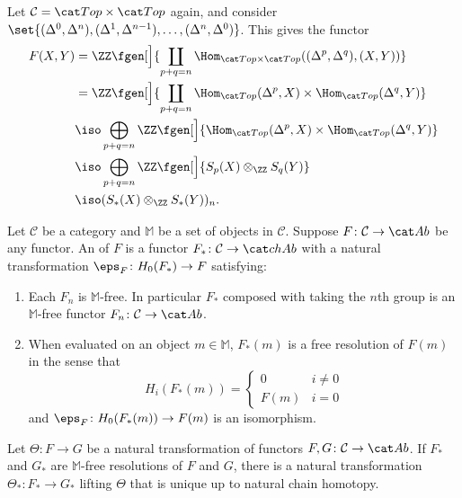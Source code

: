 \documentclass{standalone}
\begin{document}
\begin{example}
  Let \(\mathcal C = \cTop \times \cTop\) again, and consider
  \(
    \set{
      (\Delta^0, \Delta^n),
      (\Delta^1, \Delta^{n-1}), \dots,
      (\Delta^n, \Delta^0)
    }
  \).
  This gives the functor
  \begin{align*}
    F(X, Y) &= \ZZ\fgen[\Big]{\coprod_{p + q = n}
      \Hom_{\cTop \times \cTop}((\Delta^p, \Delta^q), (X, Y))} \\
    &= \ZZ\fgen[\Big]{\coprod_{p + q = n}
      \Hom_{\cTop}(\Delta^p, X) \times \Hom_{\cTop}(\Delta^q, Y)} \\
    &\iso \bigoplus_{p + q = n} \ZZ\fgen[\Big]{
      \Hom_{\cTop}(\Delta^p, X) \times \Hom_{\cTop}(\Delta^q, Y)} \\
    &\iso \bigoplus_{p + q = n} \ZZ\fgen[\Big]{S_p(X) \otimes_\ZZ S_q(Y)} \\
    &\iso (S_*(X) \otimes_\ZZ S_*(Y))_n.
  \end{align*}
\end{example}

\begin{definition}
  Let \(\mathcal C\) be a category and
      \(\mathbb M\) be a set of objects in \(\mathcal C\).
  Suppose \(F \colon \mathcal C \to \cAb\) be any functor.
  An  of \(F\) is
    a functor \(F_*\colon \mathcal C \to \cchAb\) with
    a natural transformation \(\eps_F \colon H_0(F_*) \to F\) satisfying:
  \begin{enumerate}[nosep]
    \item Each \(F_n\) is \(\mathbb M\)-free.
      In particular \(F_*\) composed with taking the \(n\)th group is
      an \(\mathbb M\)-free functor \(F_n \colon \mathcal C \to \cAb\).
    \item When evaluated on an object \(m \in \mathbb M\),
      \(F_*(m)\) is a free resolution of \(F(m)\) in the sense that
      \[
        H_i(F_*(m)) = \begin{cases}
          0 & i \neq 0 \\[-1ex]
          F(m) & i = 0
        \end{cases}
      \]
      and \(\eps_F \colon H_0(F_*(m)) \to F(m)\) is an isomorphism.
  \end{enumerate}
\end{definition}

\begin{theorem}
  Let \(\Theta \colon F \to G\) be a natural transformation of
  functors \(F, G \colon \mathcal C \to \cAb\).
  If \(F_*\) and \(G_*\) are \(\mathbb M\)-free resolutions of \(F\) and \(G\),
  there is a natural transformation \(\Theta_* \colon F_* \to G_*\)
  lifting \(\Theta\) that is unique up to natural chain homotopy.
\end{theorem}
\end{document}
